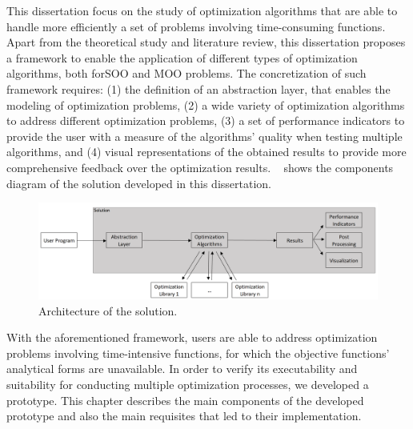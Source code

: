 \label{chap:architecture}

This dissertation focus on the study of optimization algorithms that are able to handle more efficiently a set of problems involving time-consuming functions. Apart from the theoretical study and literature review, this dissertation proposes a framework to enable the application of different types of optimization algorithms, both for\ac{SOO} and \ac{MOO} problems. The concretization of such framework requires: (1) the definition of an abstraction layer, that enables the modeling of optimization problems, (2) a wide variety of optimization algorithms to address different optimization problems, (3) a set of performance indicators to provide the user with a measure of the algorithms' quality when testing multiple algorithms, and (4) visual representations of the obtained results to provide more comprehensive feedback over the optimization results. ~ shows the components diagram of the solution developed in this dissertation.

\begin{figure}[htbp]
	\centering
	\includegraphics[width=\textwidth]{./Images/Solution/solution_architecture.PNG}
	\caption{Architecture of the solution.}
	\label{fig:solution}
\end{figure}

With the aforementioned framework, users are able to address optimization problems involving time-intensive functions, for which the objective functions' analytical forms are unavailable. In order to verify its executability and suitability for conducting multiple optimization processes, we developed a prototype. This chapter describes the main components of the developed prototype and also the main requisites that led to their implementation. 

